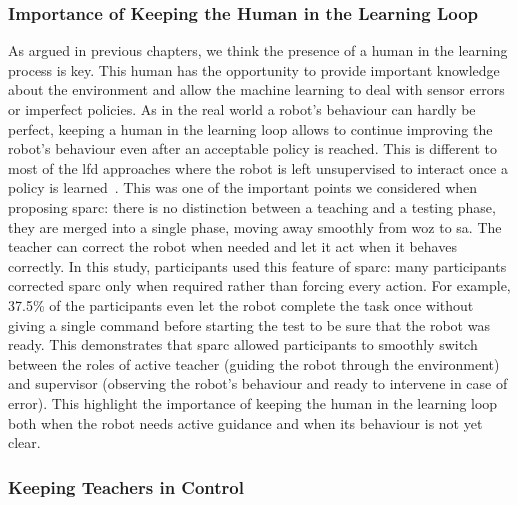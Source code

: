 \subsubsection{Importance of Keeping the Human in the Learning Loop}

As argued in previous chapters, we think the presence of a human in the learning process is key. This human has the opportunity to provide important knowledge about the environment and allow the machine learning to deal with sensor errors or imperfect policies. As in the real world a robot's behaviour can hardly be perfect, keeping a human in the learning loop allows to continue improving the robot's behaviour even after an acceptable policy is reached. This is different to most of the \gls{lfd} approaches where the robot is left unsupervised to interact once a policy is learned~\citep{argall2009survey,sequeira2016discovering}. This was one of the important points we considered when proposing \gls{sparc}: there is no distinction between a teaching and a testing phase, they are merged into a single phase, moving away smoothly from \gls{woz} to \gls{sa}. The teacher can correct the robot when needed and let it act when it behaves correctly. In this study, participants used this feature of \gls{sparc}: many participants corrected \gls{sparc} only when required rather than forcing every action. For example, 37.5\% of the participants even let the robot complete the task once without giving a single command before starting the test to be sure that the robot was ready. This demonstrates that \gls{sparc} allowed participants to smoothly switch between the roles of active teacher (guiding the robot through the environment) and supervisor (observing the robot's behaviour and ready to intervene in case of error). This highlight the importance of keeping the human in the learning loop both when the robot needs active guidance and when its behaviour is not yet clear.

\subsubsection{Keeping Teachers in Control}

